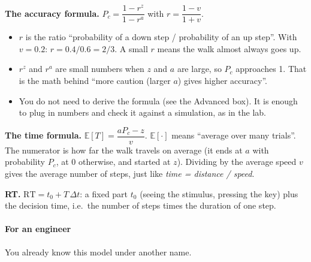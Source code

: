 \textbf{The accuracy formula.} \(P_c = \dfrac{1 - r^{z}}{1 - r^{a}}\)
with \(r = \dfrac{1-v}{1+v}\).

\begin{itemize}
\tightlist
\item
  \(r\) is the ratio ``probability of a down step / probability of an up
  step''. With \(v = 0.2\): \(r = 0.4/0.6 = 2/3\). A small \(r\) means
  the walk almost always goes up.
\item
  \(r^{z}\) and \(r^{a}\) are small numbers when \(z\) and \(a\) are
  large, so \(P_c\) approaches 1. That is the math behind ``more caution
  (larger \(a\)) gives higher accuracy''.
\item
  You do not need to derive the formula (see the Advanced box). It is
  enough to plug in numbers and check it against a simulation, as in the
  lab.
\end{itemize}

\textbf{The time formula.} \(\mathbb{E}[T] = \dfrac{a P_c - z}{v}\).
\(\mathbb{E}[\cdot]\) means ``average over many trials''. The numerator
is how far the walk travels on average (it ends at \(a\) with
probability \(P_c\), at \(0\) otherwise, and started at \(z\)). Dividing
by the average speed \(v\) gives the average number of steps, just like
\emph{time = distance / speed}.

\textbf{RT.} \(\mathrm{RT} = t_0 + T\,\Delta t\): a fixed part \(t_0\)
(seeing the stimulus, pressing the key) plus the decision time, i.e.~the
number of steps times the duration of one step.

\paragraph{For an engineer}

You already know this model under another name.

